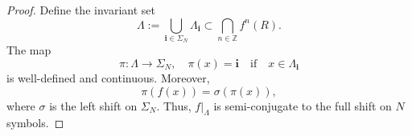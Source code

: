 \documentclass[10pt,a4paper]{amsart}
\begin{document}
\begin{proof}
Define the invariant set
\[
\Lambda := \bigcup_{\mathbf{i} \in \Sigma_N} \Lambda_{\mathbf{i}} \subset \bigcap_{n \in \mathbb{Z}} f^n(R).
\]
The map
\[
\pi : \Lambda \to \Sigma_N, \quad \pi(x) = \mathbf{i}\quad \mathrm{ if }\quad x \in \Lambda_{\mathbf{i}}
\]
is well-defined and continuous. Moreover,
\[
\pi(f(x)) = \sigma(\pi(x)),
\]
where \( \sigma \) is the left shift on \( \Sigma_N \). Thus, \( f|_\Lambda \) is semi-conjugate to the full shift on \( N \) symbols.
\end{proof}
\end{document}
